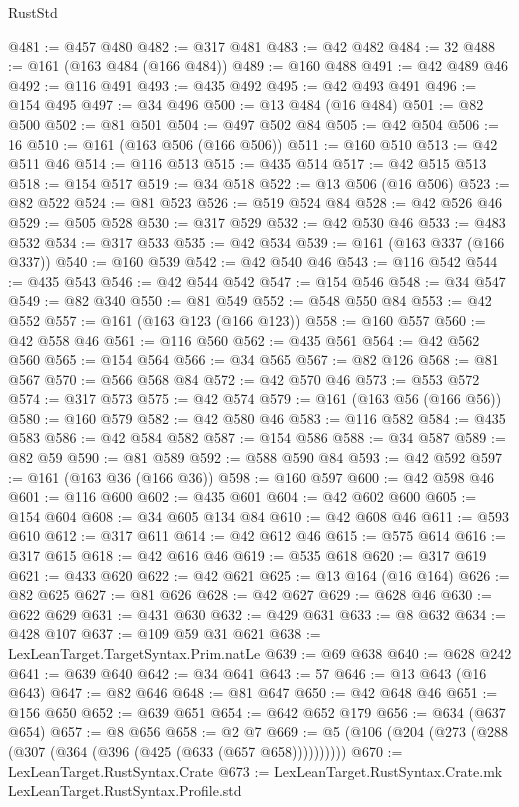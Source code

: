 \begin{lexlean}{RustStd}
\begin{coremodule}
@481 := @457 @480
@482 := @317 @481
@483 := @42 @482
@484 := 32
@488 := @161 (@163 @484 (@166 @484))
@489 := @160 @488
@491 := @42 @489 @46
@492 := @116 @491
@493 := @435 @492
@495 := @42 @493 @491
@496 := @154 @495
@497 := @34 @496
@500 := @13 @484 (@16 @484)
@501 := @82 @500
@502 := @81 @501
@504 := @497 @502 @84
@505 := @42 @504
@506 := 16
@510 := @161 (@163 @506 (@166 @506))
@511 := @160 @510
@513 := @42 @511 @46
@514 := @116 @513
@515 := @435 @514
@517 := @42 @515 @513
@518 := @154 @517
@519 := @34 @518
@522 := @13 @506 (@16 @506)
@523 := @82 @522
@524 := @81 @523
@526 := @519 @524 @84
@528 := @42 @526 @46
@529 := @505 @528
@530 := @317 @529
@532 := @42 @530 @46
@533 := @483 @532
@534 := @317 @533
@535 := @42 @534
@539 := @161 (@163 @337 (@166 @337))
@540 := @160 @539
@542 := @42 @540 @46
@543 := @116 @542
@544 := @435 @543
@546 := @42 @544 @542
@547 := @154 @546
@548 := @34 @547
@549 := @82 @340
@550 := @81 @549
@552 := @548 @550 @84
@553 := @42 @552
@557 := @161 (@163 @123 (@166 @123))
@558 := @160 @557
@560 := @42 @558 @46
@561 := @116 @560
@562 := @435 @561
@564 := @42 @562 @560
@565 := @154 @564
@566 := @34 @565
@567 := @82 @126
@568 := @81 @567
@570 := @566 @568 @84
@572 := @42 @570 @46
@573 := @553 @572
@574 := @317 @573
@575 := @42 @574
@579 := @161 (@163 @56 (@166 @56))
@580 := @160 @579
@582 := @42 @580 @46
@583 := @116 @582
@584 := @435 @583
@586 := @42 @584 @582
@587 := @154 @586
@588 := @34 @587
@589 := @82 @59
@590 := @81 @589
@592 := @588 @590 @84
@593 := @42 @592
@597 := @161 (@163 @36 (@166 @36))
@598 := @160 @597
@600 := @42 @598 @46
@601 := @116 @600
@602 := @435 @601
@604 := @42 @602 @600
@605 := @154 @604
@608 := @34 @605 @134 @84
@610 := @42 @608 @46
@611 := @593 @610
@612 := @317 @611
@614 := @42 @612 @46
@615 := @575 @614
@616 := @317 @615
@618 := @42 @616 @46
@619 := @535 @618
@620 := @317 @619
@621 := @433 @620
@622 := @42 @621
@625 := @13 @164 (@16 @164)
@626 := @82 @625
@627 := @81 @626
@628 := @42 @627
@629 := @628 @46
@630 := @622 @629
@631 := @431 @630
@632 := @429 @631
@633 := @8 @632
@634 := @428 @107
@637 := @109 @59 @31 @621
@638 := LexLeanTarget.TargetSyntax.Prim.natLe
@639 := @69 @638
@640 := @628 @242
@641 := @639 @640
@642 := @34 @641
@643 := 57
@646 := @13 @643 (@16 @643)
@647 := @82 @646
@648 := @81 @647
@650 := @42 @648 @46
@651 := @156 @650
@652 := @639 @651
@654 := @642 @652 @179
@656 := @634 (@637 @654)
@657 := @8 @656
@658 := @2 @7
@669 := @5 (@106 (@204 (@273 (@288 (@307 (@364 (@396 (@425 (@633 (@657 @658))))))))))
@670 := LexLeanTarget.RustSyntax.Crate
@673 := LexLeanTarget.RustSyntax.Crate.mk LexLeanTarget.RustSyntax.Profile.std

\end{coremodule}
\end{lexlean}
